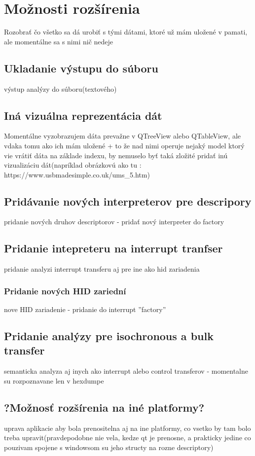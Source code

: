 \chapter{Možnosti rozšírenia}
Rozobrať čo všetko sa dá urobiť s tými dátami, ktoré už mám uložené v pamati, ale momentálne sa s nimi nič nedeje
\section{Ukladanie výstupu do súboru}
výstup analýzy do súboru(textového)
\section{Iná vizuálna reprezentácia dát}
Momentálne vyzobrazujem dáta prevažne v QTreeView alebo QTableView, ale vdaka tomu ako ich mám uložené + to že nad nimi operuje nejaký model ktorý vie vrátiť dáta na základe indexu, by nemuselo byť taká zložité pridať inú vizualizáciu dát(napríklad obrázkovú ako tu : https://www.usbmadesimple.co.uk/ums\_5.htm)
\section{Pridávanie nových interpreterov pre descripory}
pridanie nových druhov descriptorov - pridať nový interpreter do factory
\section{Pridanie intepreteru na interrupt tranfser}
pridanie analyzi interrupt transferu aj pre ine ako hid zariadenia
\subsection{Pridanie nových HID zariední}
nove HID zariadenie - pridanie do interrupt ''factory''
\section{Pridanie analýzy pre isochronous a bulk transfer}
semanticka analyza aj inych ako interrupt alebo control transferov - momentalne su rozpoznavane len v hexdumpe
\section{?Možnosť rozšírenia na iné platformy?}
uprava aplikacie aby bola prenositelna aj na ine platformy, co vsetko by tam bolo treba upravit(pravdepodobne nie vela, kedze qt je prenosne, a prakticky jedine co pouzivam spojene s windowsom su jeho structy na rozne descriptory)
